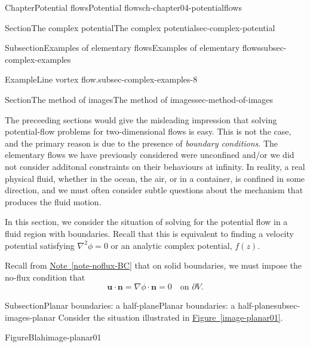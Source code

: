 \documentclass[oneside,10pt,]{book}
\newcommand{\xreffont}{\relax}
\numberwithin{equation}{section}
\newcommand{\bn}{\boldsymbol{n}}
\newcommand{\bu}{\boldsymbol{u}}
\begin{document}
\begin{chapterptx}{Chapter}{Potential flows}{}{Potential flows}{}{}{ch-chapter04-potentialflows}
\begin{sectionptx}{Section}{The complex potential}{}{The complex potential}{}{}{sec-complex-potential}
\begin{subsectionptx}{Subsection}{Examples of elementary flows}{}{Examples of elementary flows}{}{}{subsec-complex-examples}
\begin{example}{Example}{Line vortex flow.}{subsec-complex-examples-8}
\end{example}
\end{subsectionptx}
\end{sectionptx}
%
%
\typeout{************************************************}
\typeout{************************************************}
%
\begin{sectionptx}{Section}{The method of images}{}{The method of images}{}{}{sec-method-of-images}
\begin{introduction}{}%
The preceeding sections would give the misleading impression that solving potential-flow problems for two-dimensional flows is easy. This is not the case, and the primary reason is due to the presence of \emph{boundary conditions}. The elementary flows we have previously considered were unconfined and\slash{}or we did not consider additonal constraints on their behaviours at infinity. In reality, a real physical fluid, whether in the ocean, the air, or in a container, is confined in some direction, and we must often consider subtle questions about the mechanism that produces the fluid motion.%
\par
In this section, we consider the situation of solving for the potential flow in a fluid region with boundaries. Recall that this is equivalent to finding a velocity potential satisfying \(\nabla^2 \phi = 0\) or an analytic complex potential, \(f(z)\).%
\par
Recall from \hyperref[note-noflux-BC]{Note~{\xreffont\ref{note-noflux-BC}}} that on solid boundaries, we must impose the no-flux condition that%
\begin{equation*}
\bu \cdot \bn = \nabla \phi \cdot \bn = 0 \quad \text{on $\partial V$}.
\end{equation*}
%
\end{introduction}%
%
%
\typeout{************************************************}
\typeout{************************************************}
%
\begin{subsectionptx}{Subsection}{Planar boundaries: a half-plane}{}{Planar boundaries: a half-plane}{}{}{subsec-images-planar}
Consider the situation illustrated in \hyperref[image-planar01]{Figure~{\xreffont\ref{image-planar01}}}.%
\begin{figureptx}{Figure}{Blah}{image-planar01}{}%
\begin{image}{0.1}{0.8}{0.1}{}%

\end{image}
\end{figureptx}
\end{subsectionptx}
\end{sectionptx}
\end{chapterptx}
\end{document}
